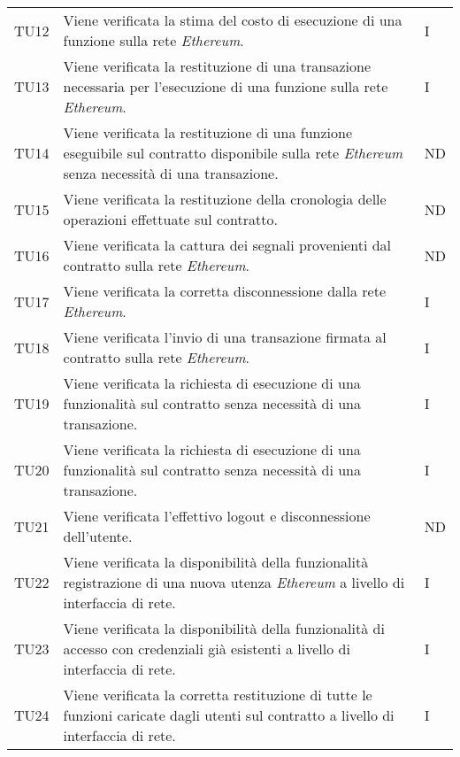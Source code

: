 \begin{longtable}{|C{1.5cm}|C{10cm}|C{1.5cm}|}
	TU12 &
	Viene verificata la stima del costo di esecuzione di una funzione sulla rete \textit{Ethereum\glos}.  &
	I \\
	
	TU13 &
	Viene verificata la restituzione di una transazione necessaria per l'esecuzione di una funzione sulla rete \textit{Ethereum\glo}.  &
	I \\
	
	TU14 &
	Viene verificata la restituzione di una funzione eseguibile sul contratto disponibile sulla rete \textit{Ethereum\glo} senza necessità di una transazione.  &
	ND \\
	
	TU15 &
	Viene verificata la restituzione della cronologia delle operazioni effettuate sul contratto.  &
	ND \\
	
	TU16 &
	Viene verificata la cattura dei segnali provenienti dal contratto sulla rete \textit{Ethereum\glos}.  &
	ND \\
	
	TU17 &
	Viene verificata la corretta disconnessione dalla rete \textit{Ethereum\glos}.  &
	I \\
	
	TU18 &
	Viene verificata l'invio di una transazione firmata al contratto sulla rete \textit{Ethereum\glos}.  &
	I \\
	
	TU19 &
	Viene verificata la richiesta di esecuzione di una funzionalità sul contratto senza necessità di una transazione.  &
	I \\
	
	TU20 &
	Viene verificata la richiesta di esecuzione di una funzionalità sul contratto senza necessità di una transazione.  &
	I \\
	
	TU21 &
	Viene verificata l'effettivo logout e disconnessione dell'utente.  &
	ND \\
	
	TU22 &
	Viene verificata la disponibilità della funzionalità registrazione di una nuova utenza \textit{Ethereum\glo} a livello di interfaccia di rete.  &
	I \\
	
	TU23 &
	Viene verificata la disponibilità della funzionalità di accesso con credenziali già esistenti a livello di interfaccia di rete.  &
	I \\
	
	TU24 &
	Viene verificata la corretta restituzione di tutte le funzioni caricate dagli utenti sul contratto a livello di interfaccia di rete.  &
	I \\
	

\end{longtable}
